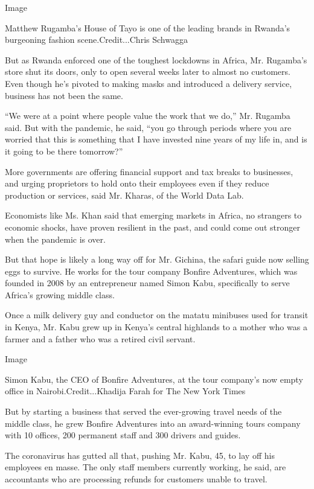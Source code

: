 Image

Matthew Rugamba's House of Tayo is one of the leading brands in Rwanda's
burgeoning fashion scene.Credit...Chris Schwagga

But as Rwanda enforced one of the toughest lockdowns in Africa, Mr.
Rugamba's store shut its doors, only to open several weeks later to
almost no customers. Even though he's pivoted to making masks and
introduced a delivery service, business has not been the same.

``We were at a point where people value the work that we do,'' Mr.
Rugamba said. But with the pandemic, he said, ``you go through periods
where you are worried that this is something that I have invested nine
years of my life in, and is it going to be there tomorrow?''

More governments are offering financial support and tax breaks to
businesses, and urging proprietors to hold onto their employees even if
they reduce production or services, said Mr. Kharas, of the World Data
Lab.

Economists like Ms. Khan said that emerging markets in Africa, no
strangers to economic shocks, have proven resilient in the past, and
could come out stronger when the pandemic is over.

But that hope is likely a long way off for Mr. Gichina, the safari guide
now selling eggs to survive. He works for the tour company Bonfire
Adventures, which was founded in 2008 by an entrepreneur named Simon
Kabu, specifically to serve Africa's growing middle class.

Once a milk delivery guy and conductor on the matatu minibuses used for
transit in Kenya, Mr. Kabu grew up in Kenya's central highlands to a
mother who was a farmer and a father who was a retired civil servant.

Image

Simon Kabu, the CEO of Bonfire Adventures, at the tour company's now
empty office in Nairobi.Credit...Khadija Farah for The New York Times

But by starting a business that served the ever-growing travel needs of
the middle class, he grew Bonfire Adventures into an award-winning tours
company with 10 offices, 200 permanent staff and 300 drivers and guides.

The coronavirus has gutted all that, pushing Mr. Kabu, 45, to lay off
his employees en masse. The only staff members currently working, he
said, are accountants who are processing refunds for customers unable to
travel.

